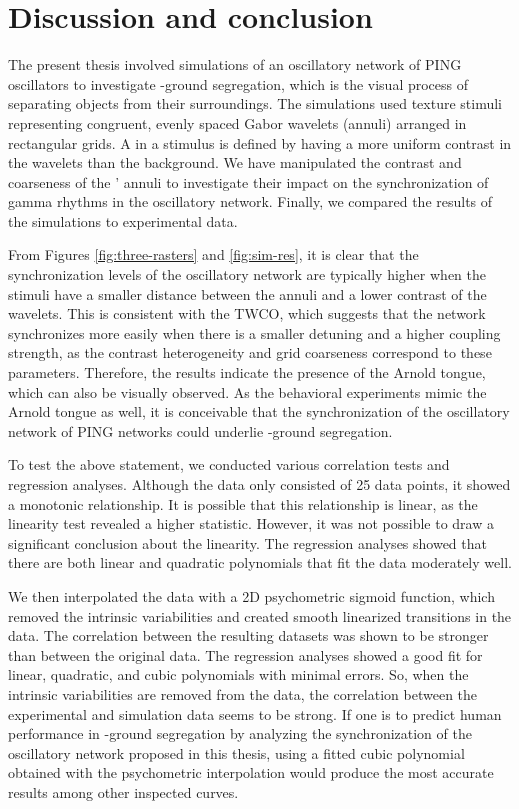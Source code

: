 \section{Discussion and conclusion}

The present thesis involved simulations of an oscillatory network of PING oscillators to investigate \stimfig-ground segregation, which is the visual process of separating objects from their surroundings. The simulations used texture stimuli representing congruent, evenly spaced Gabor wavelets (annuli) arranged in rectangular grids. A \stimfig{} in a stimulus is defined by having a more uniform contrast in the wavelets than the background. We have manipulated the contrast and coarseness of the \stimfigs' annuli to investigate their impact on the synchronization of gamma rhythms in the oscillatory network. Finally, we compared the results of the simulations to experimental data.

From Figures \ref{fig:three-rasters} and \ref{fig:sim-res}, it is clear that the synchronization levels of the oscillatory network are typically higher when the stimuli have a smaller distance between the annuli and a lower contrast of the wavelets. This is consistent with the TWCO, which suggests that the network synchronizes more easily when there is a smaller detuning and a higher coupling strength, as the contrast heterogeneity and grid coarseness correspond to these parameters. Therefore, the results indicate the presence of the Arnold tongue, which can also be visually observed.
As the behavioral experiments mimic the Arnold tongue as well, it is conceivable that the synchronization of the oscillatory network of PING networks could underlie \stimfig-ground segregation.

To test the above statement, we conducted various correlation tests and regression analyses. Although the data only consisted of 25 data points, it showed a monotonic relationship. It is possible that this relationship is linear, as the linearity test revealed a higher statistic. However, it was not possible to draw a significant conclusion about the linearity.
The regression analyses showed that there are both linear and quadratic polynomials that fit the data moderately well. 

We then interpolated the data with a 2D psychometric sigmoid function, which removed the intrinsic variabilities and created smooth linearized transitions in the data. The correlation between the resulting datasets was shown to be stronger than between the original data. The regression analyses showed a good fit for linear, quadratic, and cubic polynomials with minimal errors. So, when the intrinsic variabilities are removed from the data, the correlation between the experimental and simulation data seems to be strong.
If one is to predict human performance in \stimfig-ground segregation by analyzing the synchronization of the oscillatory network proposed in this thesis, using a fitted cubic polynomial obtained with the psychometric interpolation would produce the most accurate results among other inspected curves.

